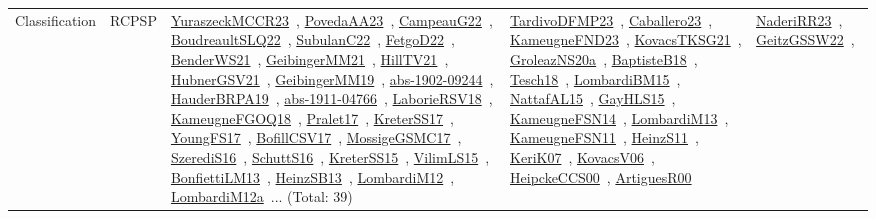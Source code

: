 {\begin{longtable}{lp{3cm}>{\raggedright\arraybackslash}p{6cm}>{\raggedright\arraybackslash}p{6cm}>{\raggedright\arraybackslash}p{8cm}}
Classification & RCPSP & \href{articles/YuraszeckMCCR23.pdf}{YuraszeckMCCR23}~\cite{YuraszeckMCCR23}, \href{papers/PovedaAA23.pdf}{PovedaAA23}~\cite{PovedaAA23}, \href{articles/CampeauG22.pdf}{CampeauG22}~\cite{CampeauG22}, \href{papers/BoudreaultSLQ22.pdf}{BoudreaultSLQ22}~\cite{BoudreaultSLQ22}, \href{articles/SubulanC22.pdf}{SubulanC22}~\cite{SubulanC22}, \href{articles/FetgoD22.pdf}{FetgoD22}~\cite{FetgoD22}, \href{papers/BenderWS21.pdf}{BenderWS21}~\cite{BenderWS21}, \href{papers/GeibingerMM21.pdf}{GeibingerMM21}~\cite{GeibingerMM21}, \href{papers/HillTV21.pdf}{HillTV21}~\cite{HillTV21}, \href{articles/HubnerGSV21.pdf}{HubnerGSV21}~\cite{HubnerGSV21}, \href{papers/GeibingerMM19.pdf}{GeibingerMM19}~\cite{GeibingerMM19}, \href{articles/abs-1902-09244.pdf}{abs-1902-09244}~\cite{abs-1902-09244}, \href{articles/HauderBRPA19.pdf}{HauderBRPA19}~\cite{HauderBRPA19}, \href{articles/abs-1911-04766.pdf}{abs-1911-04766}~\cite{abs-1911-04766}, \href{articles/LaborieRSV18.pdf}{LaborieRSV18}~\cite{LaborieRSV18}, \href{papers/KameugneFGOQ18.pdf}{KameugneFGOQ18}~\cite{KameugneFGOQ18}, \href{papers/Pralet17.pdf}{Pralet17}~\cite{Pralet17}, \href{articles/KreterSS17.pdf}{KreterSS17}~\cite{KreterSS17}, \href{papers/YoungFS17.pdf}{YoungFS17}~\cite{YoungFS17}, \href{papers/BofillCSV17.pdf}{BofillCSV17}~\cite{BofillCSV17}, \href{papers/MossigeGSMC17.pdf}{MossigeGSMC17}~\cite{MossigeGSMC17}, \href{papers/SzerediS16.pdf}{SzerediS16}~\cite{SzerediS16}, \href{papers/SchuttS16.pdf}{SchuttS16}~\cite{SchuttS16}, \href{papers/KreterSS15.pdf}{KreterSS15}~\cite{KreterSS15}, \href{papers/VilimLS15.pdf}{VilimLS15}~\cite{VilimLS15}, \href{papers/BonfiettiLM13.pdf}{BonfiettiLM13}~\cite{BonfiettiLM13}, \href{articles/HeinzSB13.pdf}{HeinzSB13}~\cite{HeinzSB13}, \href{articles/LombardiM12.pdf}{LombardiM12}~\cite{LombardiM12}, \href{articles/LombardiM12a.pdf}{LombardiM12a}~\cite{LombardiM12a}... (Total: 39) & \href{papers/TardivoDFMP23.pdf}{TardivoDFMP23}~\cite{TardivoDFMP23}, \href{articles/Caballero23.pdf}{Caballero23}~\cite{Caballero23}, \href{papers/KameugneFND23.pdf}{KameugneFND23}~\cite{KameugneFND23}, \href{papers/KovacsTKSG21.pdf}{KovacsTKSG21}~\cite{KovacsTKSG21}, \href{papers/GroleazNS20a.pdf}{GroleazNS20a}~\cite{GroleazNS20a}, \href{articles/BaptisteB18.pdf}{BaptisteB18}~\cite{BaptisteB18}, \href{papers/Tesch18.pdf}{Tesch18}~\cite{Tesch18}, \href{papers/LombardiBM15.pdf}{LombardiBM15}~\cite{LombardiBM15}, \href{articles/NattafAL15.pdf}{NattafAL15}~\cite{NattafAL15}, \href{papers/GayHLS15.pdf}{GayHLS15}~\cite{GayHLS15}, \href{articles/KameugneFSN14.pdf}{KameugneFSN14}~\cite{KameugneFSN14}, \href{papers/LombardiM13.pdf}{LombardiM13}~\cite{LombardiM13}, \href{papers/KameugneFSN11.pdf}{KameugneFSN11}~\cite{KameugneFSN11}, \href{papers/HeinzS11.pdf}{HeinzS11}~\cite{HeinzS11}, \href{papers/KeriK07.pdf}{KeriK07}~\cite{KeriK07}, \href{papers/KovacsV06.pdf}{KovacsV06}~\cite{KovacsV06}, \href{articles/HeipckeCCS00.pdf}{HeipckeCCS00}~\cite{HeipckeCCS00}, \href{articles/ArtiguesR00.pdf}{ArtiguesR00}~\cite{ArtiguesR00} & \href{articles/NaderiRR23.pdf}{NaderiRR23}~\cite{NaderiRR23}, \href{papers/GeitzGSSW22.pdf}{GeitzGSSW22}~\cite{GeitzGSSW22}, 
\end{longtable}}
